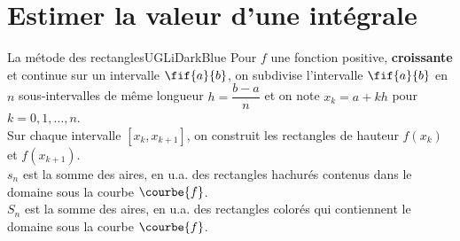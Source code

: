 \documentclass[a4paper,11pt,cours]{nsi} %
\begin{document}
\section{Estimer la valeur d'une intégrale}

\begin{encadrecolore}{La métode des rectangles}{UGLiDarkBlue}
        Pour $f$ une fonction positive, \textbf{croissante} et continue sur un intervalle $\fif{a}{b}$, on subdivise l'intervalle $\fif{a}{b}$ en $n$ sous-intervalles de même longueur $h = \dfrac{b-a}{n}$ et on note $x_k=a+kh$ pour $k=0,1,\ldots,n$.\\
        Sur chaque intervalle $[x_k,x_{k+1}]$, on construit les rectangles de hauteur $f(x_k)$ et $f(x_{k+1})$.\\
        $s_n$ est la somme des aires, en u.a. des rectangles hachurés contenus dans le domaine sous la courbe $\courbe{f}$.\\
        $S_n$ est la somme des aires, en u.a. des rectangles colorés qui contiennent le domaine sous la courbe $\courbe{f}$.


\end{encadrecolore}
\end{document}
